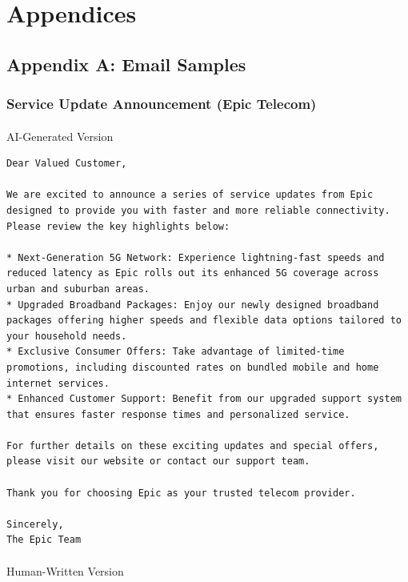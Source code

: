 \documentclass[
  letterpaper,
  DIV=11,
  numbers=noendperiod]{scrartcl}
\makeatletter
\let\oldparagraph\paragraph
\renewcommand{\paragraph}{
    \@ifstar
      \xxxParagraphStar
      \xxxParagraphNoStar
  }
\newcommand{\xxxParagraphStar}[1]{\oldparagraph*{#1}\mbox{}}
\newcommand{\xxxParagraphNoStar}[1]{\oldparagraph{#1}\mbox{}}
\makeatother
\begin{document}
\section{Appendices}\label{appendices}

\subsection{Appendix A: Email Samples}\label{appendix-a-email-samples}

\subsubsection{Service Update Announcement (Epic
Telecom)}\label{service-update-announcement-epic-telecom}

\paragraph{AI-Generated Version}\label{ai-generated-version}

\begin{verbatim}
Dear Valued Customer,

We are excited to announce a series of service updates from Epic designed to provide you with faster and more reliable connectivity. Please review the key highlights below:

* Next-Generation 5G Network: Experience lightning-fast speeds and reduced latency as Epic rolls out its enhanced 5G coverage across urban and suburban areas.
* Upgraded Broadband Packages: Enjoy our newly designed broadband packages offering higher speeds and flexible data options tailored to your household needs.
* Exclusive Consumer Offers: Take advantage of limited-time promotions, including discounted rates on bundled mobile and home internet services.
* Enhanced Customer Support: Benefit from our upgraded support system that ensures faster response times and personalized service.

For further details on these exciting updates and special offers, please visit our website or contact our support team.

Thank you for choosing Epic as your trusted telecom provider.

Sincerely,
The Epic Team
\end{verbatim}

\paragraph{Human-Written Version}\label{human-written-version}
\end{document}
